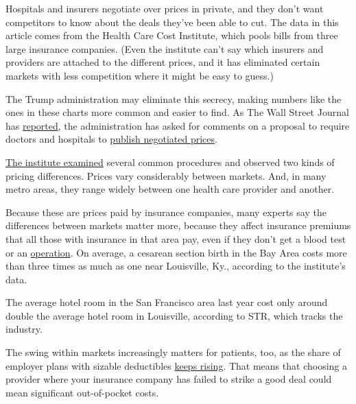 Hospitals and insurers negotiate over prices in private, and they don't
want competitors to know about the deals they've been able to cut. The
data in this article comes from the Health Care Cost Institute, which
pools bills from three large insurance companies. (Even the institute
can't say which insurers and providers are attached to the different
prices, and it has eliminated certain markets with less competition
where it might be easy to guess.)

The Trump administration may eliminate this secrecy, making numbers like
the ones in these charts more common and easier to find. As The Wall
Street Journal has
\href{https://www.wsj.com/articles/trump-administration-weighs-publicizing-hospital-rates-negotiated-with-insurers-11551990505}{reported},
the administration has asked for comments on a proposal to require
doctors and hospitals to
\href{https://www.nytimes3xbfgragh.onion/2019/03/08/us/politics/trump-health-care-rates.html}{publish
negotiated prices}.

\href{https://www.healthcostinstitute.org/blog/entry/hmi-2019-service-prices}{The
institute examined} several common procedures and observed two kinds of
pricing differences. Prices vary considerably between markets. And, in
many metro areas, they range widely between one health care provider and
another.

Because these are prices paid by insurance companies, many experts say
the differences between markets matter more, because they affect
insurance premiums that all those with insurance in that area pay, even
if they don't get a blood test or an
\href{https://www.nytimes3xbfgragh.onion/interactive/2015/12/15/upshot/the-best-places-for-better-cheaper-health-care-arent-what-experts-thought.html}{operation}.
On average, a cesarean section birth in the Bay Area costs more than
three times as much as one near Louisville, Ky., according to the
institute's data.

The average hotel room in the San Francisco area last year cost only
around double the average hotel room in Louisville, according to STR,
which tracks the industry.

The swing within markets increasingly matters for patients, too, as the
share of employer plans with sizable deductibles
\href{https://www.nytimes3xbfgragh.onion/2016/09/15/business/health-insurance-analysis-kaiser.html}{keeps
rising}. That means that choosing a provider where your insurance
company has failed to strike a good deal could mean significant
out-of-pocket costs.

